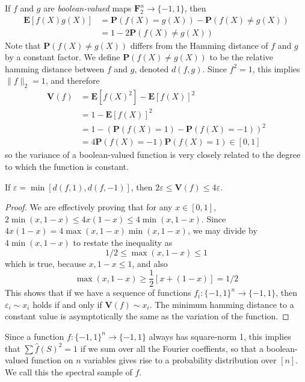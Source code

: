If $f$ and $g$ are {\it boolean-valued} maps $\mathbf{F}_2^n \to \{ -1 , 1 \}$, then
%
\begin{align*}
    \mathbf{E}[f(X)g(X)] &= \mathbf{P}(f(X) = g(X)) - \mathbf{P}(f(X) \neq g(X))\\
    &= 1 - 2\mathbf{P}(f(X) \neq g(X))
\end{align*}
%
Note that $\mathbf{P}(f(X) \neq g(X))$ differs from the Hamming distance of $f$ and $g$ by a constant factor. We define $\mathbf{P}(f(X) \neq g(X))$ to be the relative hamming distance between $f$ and $g$, denoted $d(f,g)$. Since $f^2 = 1$, this implies $\| f \|_2 = 1$, and therefore
%
\begin{align*}
    \mathbf{V}(f) &= \mathbf{E}[f(X)^2] - \mathbf{E}[f(X)]^2\\
    &= 1 - \mathbf{E}[f(X)]^2\\
    &= 1 - (\mathbf{P}(f(X) = 1) - \mathbf{P}(f(X) = - 1))^2\\
    &= 4 \mathbf{P}(f(X) = -1) \mathbf{P}(f(X) = 1) \in [0,1]
\end{align*}
%
so the variance of a boolean-valued function is very closely related to the degree to which the function is constant.

\begin{theorem}
    If $\varepsilon = \min[d(f,1), d(f,-1)]$, then $2 \varepsilon \leq \mathbf{V}(f) \leq 4 \varepsilon$.
\end{theorem}
\begin{proof}
    We are effectively proving that for any $x \in [0,1]$, $2\min(x,1-x) \leq 4x(1-x) \leq 4\min(x,1-x)$. Since $4x(1-x) = 4\max(x,1-x)\min(x,1-x)$, we may divide by $4 \min(x,1-x)$ to restate the inequality as
    \[ 1/2 \leq \max(x,1-x) \leq 1 \]
    which is true, because $x,1-x \leq 1$, and also
    \[ \max(x,1-x) \geq \frac{1}{2}[x + (1-x)] = 1/2 \]
    This shows that if we have a sequence of functions $f_i: \{ -1, 1 \}^n \to \{ -1, 1 \}$, then $\varepsilon_i \sim x_i$ holds if and only if $\mathbf{V}(f) \sim x_i$. The minimum hamming distance to a constant value is asymptotically the same as the variation of the function.
\end{proof}

Since a function $f: \{ -1, 1 \}^n \to \{ -1, 1 \}$ always has square-norm 1, this implies that $\sum \widehat{f}(S)^2 = 1$ if we sum over all the Fourier coeffients, so that a boolean-valued function on $n$ variables gives rise to a probability distribution over $[n]$. We call this the spectral sample of $f$.

